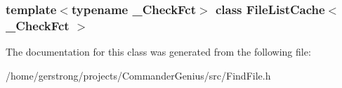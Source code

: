 \subsubsection*{template$<$typename \_\-CheckFct$>$ class FileListCache$<$ \_\-CheckFct $>$}



The documentation for this class was generated from the following file:\begin{DoxyCompactItemize}
\item 
/home/gerstrong/projects/CommanderGenius/src/FindFile.h\end{DoxyCompactItemize}
